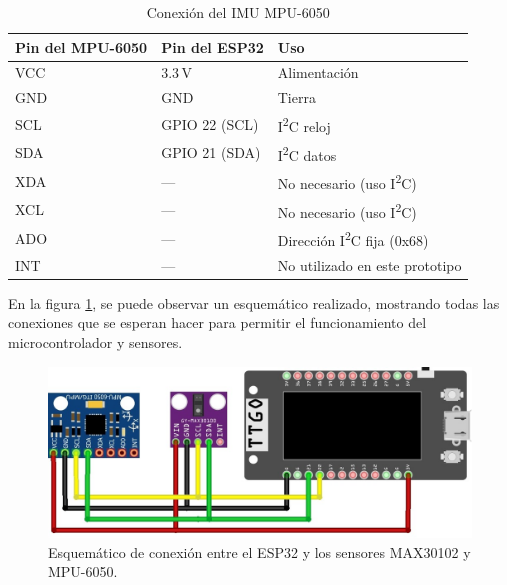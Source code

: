 \documentclass[12pt, a4paper]{article}
\begin{document}
	
	\begin{table}[ht]
		\centering
		\caption{Conexión del IMU MPU-6050}
		\label{tab:conexion_mpu6050}
		\begin{tabular}{|p{3.5cm}|p{3cm}|p{5cm}|}
			\hline
			\textbf{Pin del MPU-6050} & \textbf{Pin del ESP32}      & \textbf{Uso}                            \\ \hline
			VCC                        & 3.3\,V                       & Alimentación                                  \\ \hline
			GND                        & GND                          & Tierra                                           \\ \hline
			SCL                        & GPIO 22 (SCL)                & I\textsuperscript{2}C reloj                    \\ \hline
			SDA                        & GPIO 21 (SDA)                & I\textsuperscript{2}C datos                    \\ \hline
			XDA                        & —                            & No necesario (uso I\textsuperscript{2}C)        \\ \hline
			XCL                        & —                            & No necesario (uso I\textsuperscript{2}C)        \\ \hline
			ADO                        & —                            & Dirección I\textsuperscript{2}C fija (0x68)     \\ \hline
			INT                        & —                            & No utilizado en este prototipo                \\ \hline
		\end{tabular}
	\end{table}
	
	
	En la figura \ref{fig:esquema_prototipo}, se puede observar un esquemático realizado, mostrando todas las conexiones que se esperan hacer para permitir el funcionamiento del microcontrolador y sensores.
	\begin{figure}[htbp]
		\centering
		\includegraphics[width=\textwidth]{images/esquema_prototipo.jpg}
		\caption[Esquemático del prototipo]{Esquemático de conexión entre el ESP32 y los sensores MAX30102 y MPU-6050.}
		\label{fig:esquema_prototipo}
	\end{figure}
	
\end{document}
